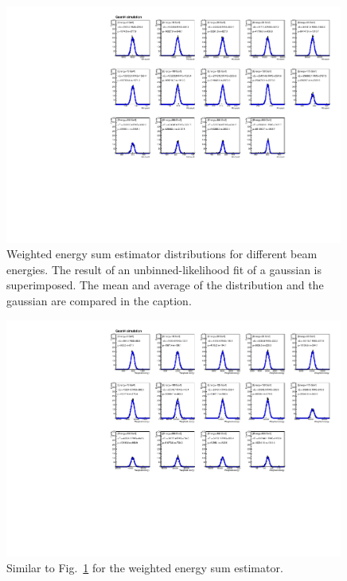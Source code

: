 \begin{figure}[h!]
  \begin{center}
    \includegraphics[width=0.99\textwidth]{figures/recenergy_nemHits}
    \caption{Weighted energy sum estimator distributions for different
    beam energies. The result of an unbinned-likelihood fit of a gaussian is
    superimposed. The mean and average of the distribution and the
    gaussian are compared in the caption.}
    \label{fig:fithitcount}
  \end{center}
\end{figure}

\begin{figure}[h!]
  \begin{center}
    \includegraphics[width=0.99\textwidth]{figures/recenergy_sumWEn}
    \caption{Similar to Fig.~\ref{fig:fithitcount} for the weighted energy sum estimator.}
    \label{fig:fitwen}
  \end{center}
\end{figure}

